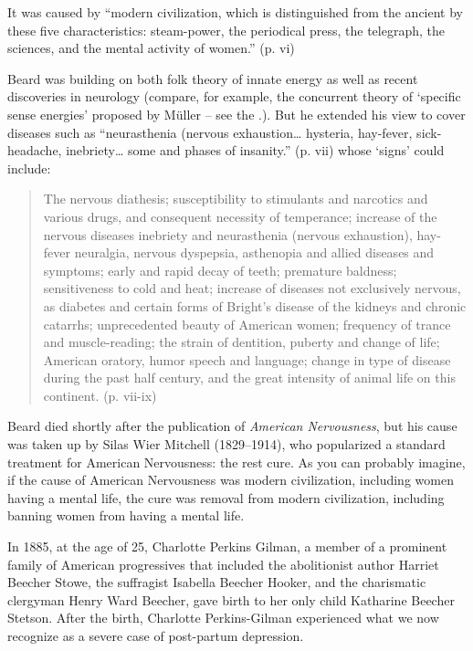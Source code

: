 \begin{refsection}
It was caused by ``modern civilization, which is distinguished from the ancient by these five characteristics: steam-power, the periodical press, the telegraph, the sciences, and the mental activity of women.'' (p. vi)

Beard was building on both folk theory of innate energy as well as recent discoveries in neurology (compare, for example, the concurrent theory of `specific sense energies' proposed by Müller – see the .). But he extended his view to cover diseases such as ``neurasthenia (nervous exhaustion{\ldots} hysteria, hay-fever, sick-headache, inebriety{\ldots} some and phases of insanity.'' (p. vii) whose `signs' could include:

\begin{quote}

The nervous diathesis; susceptibility to stimulants and narcotics and various drugs, and consequent necessity of temperance; increase of the nervous diseases inebriety and neurasthenia (nervous exhaustion), hay-fever neuralgia, nervous dyspepsia, asthenopia and allied diseases and symptoms; early and rapid decay of teeth; premature baldness; sensitiveness to cold and heat; increase of diseases not exclusively nervous, as diabetes and certain forms of Bright's disease of the kidneys and chronic catarrhs; unprecedented beauty of American women; frequency of trance and muscle-reading; the strain of dentition, puberty and change of life; American oratory, humor speech and language; change in type of disease during the past half century, and the great intensity of animal life on this continent. (p. vii-ix)
\end{quote}

Beard died shortly after the publication of \emph{American Nervousness}, but his cause was taken up by Silas Wier Mitchell (1829--1914), who popularized a standard treatment for American Nervousness: the rest cure. As you can probably imagine, if the cause of American Nervousness was modern civilization, including women having a mental life, the cure was removal from modern civilization, including banning women from having a mental life.

In 1885, at the age of 25, Charlotte Perkins Gilman, a member of a prominent family of American progressives that included the abolitionist author Harriet Beecher Stowe, the suffragist Isabella Beecher Hooker, and the charismatic clergyman Henry Ward Beecher, gave birth to her only child Katharine Beecher Stetson. After the birth, Charlotte Perkins-Gilman experienced what we now recognize as a severe case of post-partum depression.


\end{refsection}
